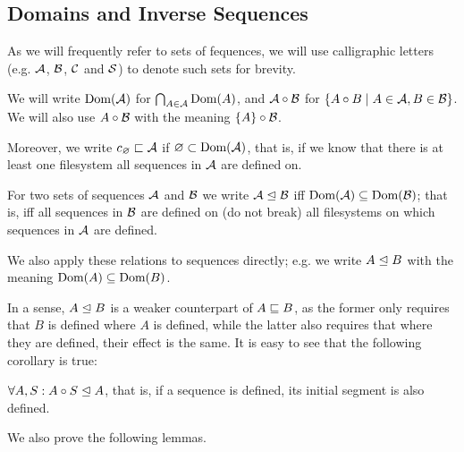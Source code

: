 

\subsection{Domains and Inverse Sequences}

\begin{mydef}
As we will frequently refer to sets of fequences,
we will use calligraphic letters (e.g. $\mathcal{A}$, $\mathcal{B}$, $\mathcal{C}$ and $\mathcal{S}$)
to denote such sets for brevity.

We will write $\textrm{Dom}({\mathcal{A}})$ for $\bigcap_{A\in\mathcal{A}} \textrm{Dom}({A})$,
and $\mathcal{A}\circ\mathcal{B}$ for $\{A\circ B\mathrel{|} A\in\mathcal{A}, B\in\mathcal{B}\}$.
We will also use $A\circ\mathcal{B}$ with the meaning $\{A\}\circ\mathcal{B}$.

Moreover, we write $c_\varnothing\sqsubset{\mathcal{A}}$ if $\varnothing \subset \textrm{Dom}({\mathcal{A}})$, that is,
if we know that there is at least one filesystem
all sequences in $\mathcal{A}$ are defined on.
\end{mydef}


\begin{mydef}[$\worksmeqsign$]\label{def_works}
For two sets of sequences $\mathcal{A}$ and $\mathcal{B}$
we write ${\mathcal{A}}\trianglelefteq{\mathcal{B}}$ iff $\textrm{Dom}({\mathcal{A}}) \subseteq \textrm{Dom}({\mathcal{B}})$;
that is, iff all sequences in $\mathcal{B}$ are defined on (do not break)
all filesystems on which sequences in $\mathcal{A}$ are defined.

We also apply these relations to sequences directly;
e.g. we write
${A}\trianglelefteq{B}$ with the meaning $\textrm{Dom}({A}) \subseteq \textrm{Dom}({B})$.
\end{mydef}

In a sense, $A\trianglelefteq B$ is a weaker counterpart of $A\sqsubseteq B$, as the former
only requires that $B$ is defined where $A$ is defined, 
while the latter also requires
that where they are defined, their effect is the same.
It is easy to see that the following corollary is true:

\begin{mycor}\label{worksextpostfix}
$\forall A,S: {A\circ S}\trianglelefteq{A}$, that is, if a sequence is defined,
its initial segment is also defined.
\end{mycor}

We also prove the following lemmas.

